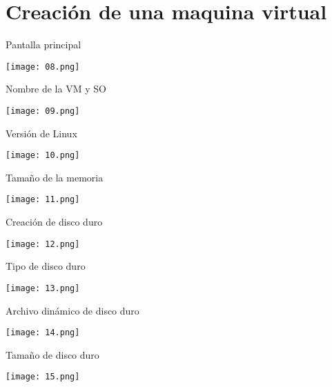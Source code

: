 \section{Creación de una maquina virtual}

\begin{frame}[c]{Pantalla principal}
  \begin{center}
    \texttt{[image: 08.png]}
  \end{center}
\end{frame}

\begin{frame}[c]{Nombre de la VM y SO}
  \begin{center}
    \texttt{[image: 09.png]}
  \end{center}
\end{frame}

\begin{frame}[c]{Versión de Linux}
  \begin{center}
    \texttt{[image: 10.png]}
  \end{center}
\end{frame}

\begin{frame}[c]{Tamaño de la memoria}
  \begin{center}
    \texttt{[image: 11.png]}
  \end{center}
\end{frame}

\begin{frame}[c]{Creación de disco duro}
  \begin{center}
    \texttt{[image: 12.png]}
  \end{center}
\end{frame}

\begin{frame}[c]{Tipo de disco duro}
  \begin{center}
    \texttt{[image: 13.png]}
  \end{center}
\end{frame}

\begin{frame}[c]{Archivo dinámico de disco duro}
  \begin{center}
    \texttt{[image: 14.png]}
  \end{center}
\end{frame}

\begin{frame}[c]{Tamaño de disco duro}
  \begin{center}
    \texttt{[image: 15.png]}
  \end{center}
\end{frame}

